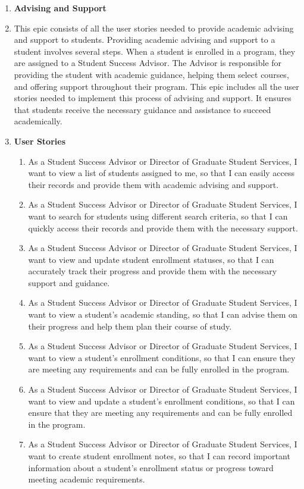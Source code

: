\documentclass[12pt]{article}
\begin{document}
\begin{appendices}
\begin{enumerate}[label=(\roman*)]
        \item \textbf{Advising and Support}
        \item[] This epic consists of all the user stories needed to provide academic advising and support to students. Providing academic advising and support to a student involves several steps. When a student is enrolled in a program, they are assigned to a Student Success Advisor. The Advisor is responsible for providing the student with academic guidance, helping them select courses, and offering support throughout their program. This epic includes all the user stories needed to implement this process of advising and support. It ensures that students receive the necessary guidance and assistance to succeed academically.
        \item[] \textbf{User Stories}
        \begin{enumerate}
            \item As a Student Success Advisor or Director of Graduate Student Services, I want to view a list of students assigned to me, so that I can easily access their records and provide them with academic advising and support.
            \item As a Student Success Advisor or Director of Graduate Student Services, I want to search for students using different search criteria, so that I can quickly access their records and provide them with the necessary support.
            \item As a Student Success Advisor or Director of Graduate Student Services, I want to view and update student enrollment statuses, so that I can accurately track their progress and provide them with the necessary support and guidance.
            \item As a Student Success Advisor or Director of Graduate Student Services, I want to view a student's academic standing, so that I can advise them on their progress and help them plan their course of study.
            \item As a Student Success Advisor or Director of Graduate Student Services, I want to view a student's enrollment conditions, so that I can ensure they are meeting any requirements and can be fully enrolled in the program.
            \item As a Student Success Advisor or Director of Graduate Student Services, I want to view and update a student's enrollment conditions, so that I can ensure that they are meeting any requirements and can be fully enrolled in the program.
            \item As a Student Success Advisor or Director of Graduate Student Services, I want to create student enrollment notes, so that I can record important information about a student's enrollment status or progress toward meeting academic requirements.

\end{enumerate}
\end{enumerate}
\end{appendices}
\end{document}
